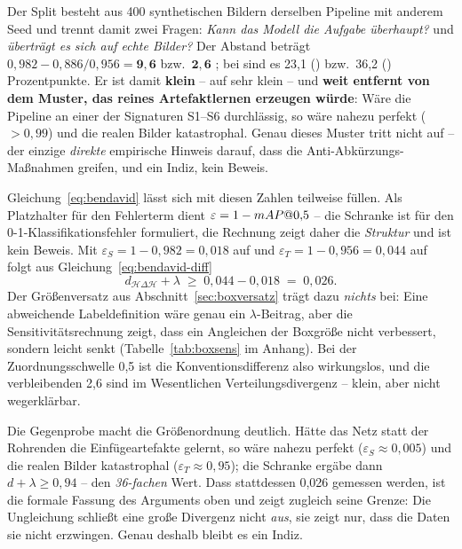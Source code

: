 \label{sec:simtoreal}
Der Split  besteht aus 400 synthetischen Bildern derselben Pipeline
mit anderem Seed und trennt damit zwei Fragen: \emph{Kann das Modell die Aufgabe
überhaupt?} und \emph{überträgt es sich auf echte Bilder?} Der Abstand beträgt
$0{,}982 - 0{,}886/0{,}956 = \mathbf{9{,}6}$ bzw.\ $\mathbf{2{,}6}$\PP{}
\mAPfifty{}; bei \mAPall{} sind es 23,1 () bzw.\ 36,2 ()
Prozentpunkte. Er ist damit \textbf{klein} -- auf  sehr klein -- und
\textbf{weit entfernt von dem Muster, das reines Artefaktlernen erzeugen
würde}: Wäre die Pipeline an
einer der Signaturen S1--S6 durchlässig, so wäre  nahezu perfekt
($>0{,}99$) und die realen Bilder katastrophal. Genau dieses Muster tritt nicht auf -- der einzige
\emph{direkte} empirische Hinweis darauf, dass die Anti-Abkürzungs-Maßnahmen
greifen, und ein Indiz, kein Beweis.

 Gleichung~\eqref{eq:bendavid} lässt
sich mit diesen Zahlen teilweise füllen. Als Platzhalter für den Fehlerterm dient
$\varepsilon = 1 - mAP@0{,}5{}$ -- die Schranke ist für den
0-1-Klassifikationsfehler formuliert, die Rechnung zeigt daher die
\emph{Struktur} und ist kein Beweis. Mit $\varepsilon_S = 1 - 0{,}982 = 0{,}018$
auf  und $\varepsilon_T = 1 - 0{,}956 = 0{,}044$ auf  folgt
aus Gleichung~\eqref{eq:bendavid-diff}
\[
d_{\mathcal{H}\Delta\mathcal{H}} + \lambda \;\geq\; 0{,}044 - 0{,}018
\;=\; 0{,}026 .
\]
Der Größenversatz aus Abschnitt~\ref{sec:boxversatz} trägt dazu \emph{nichts}
bei: Eine abweichende Labeldefinition wäre genau ein $\lambda$-Beitrag, aber die
Sensitivitätsrechnung zeigt, dass ein Angleichen der Boxgröße \mAPfifty{} nicht
verbessert, sondern leicht senkt (Tabelle~\ref{tab:boxsens} im Anhang). Bei der
Zuordnungsschwelle 0,5 ist die Konventionsdifferenz also wirkungslos, und die
verbleibenden 2,6\PP{} sind im Wesentlichen Verteilungsdivergenz -- klein, aber
nicht wegerklärbar.

Die Gegenprobe macht die Größenordnung deutlich. Hätte das Netz statt der
Rohrenden die Einfügeartefakte gelernt, so wäre  nahezu perfekt
($\varepsilon_S \approx 0{,}005$) und die realen Bilder katastrophal
($\varepsilon_T \approx 0{,}95$); die Schranke ergäbe dann
$d + \lambda \geq 0{,}94$ -- den \emph{36-fachen} Wert. Dass stattdessen 0,026
gemessen werden, ist die formale Fassung des Arguments oben und zeigt zugleich
seine Grenze: Die Ungleichung schließt eine große Divergenz nicht \emph{aus}, sie zeigt
nur, dass die Daten sie nicht erzwingen. Genau deshalb bleibt es ein Indiz.

